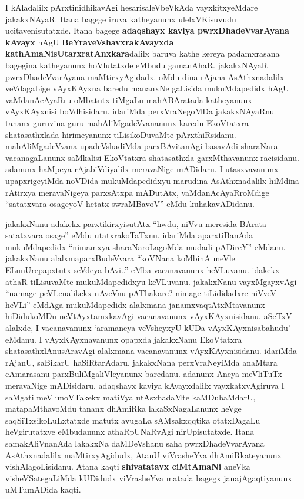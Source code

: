 I kAladalilx pArxtinidhikavAgi hesarisaleVbeVkAda vayxkitxyeMdare jakakxNAyaR. Itana bagege iruva katheyanunx ulelxVKisuvudu ucitavenisutatxde. Itana bagege \textbf{adaqshayx kaviya pwrxDhadeVvarAyana kAvayx} hAgU \textbf{BeYraveVshavxrakAvayxda kathAmaNisUtarxratAnxkara}dalilx baruva kathe kereya padamxrasana bagegina katheyanunx hoVlutatxde eMbudu gamanAhaR. jakakxNAyaR pwrxDhadeVvarAyana maMtirxyAgidadx. oMdu dina rAjana AsAthxnadalilx veVdagaLige vAyxKAyxna baredu mananxNe gaLisida mukuMdapedidx hAgU vaMdanAcAyaRru oMbatutx tiMgaLu mahABAratada katheyanunx vAyxKAyxnisi boVdhisidaru. idariMda perxVraNegoMDa jakakxNAyaRnu tananx guruvina guru mahA\-liMgadeVvananunx karedu EkoVtatxra shatasathxlada hirimeyanunx tiLisikoDuvaMte pArxthiRsidanu. mahAliMgadeVvana upadeVshadiMda parxBAvitanAgi basavAdi sharaNara vacanagaLanunx saMkalisi EkoVtatxra shatasathxla garxMthavanunx racisidanu. adanunx haMpeya rAjabiVdiyalilx meravaNige mADidaru. I utasxvavanunx upapxrigeyiMda noVDida mukuMdapedidxyu marudina AsAthxnadalilx hiMdina rAtirxya meravaNigeya parxsAtxpa mADutAtx, vaMdanAcAyaRroMdige ``satatxvara osageyoV hetatx swraMBavoV'' eMdu kuhakavADidanu.

\vskip 2pt

jakakxNanu adakekx parxtikirxyisutAtx ``hwdu, niVvu meresida BArata satatxvara osage'' eMdu utatxrakoTaTxnu. idariMda aparxtiBanAda mukuMdapedidx ``nimamxya sharaNaroLagoMda mudadi pADireY'' eMdanu. jakakxNanu alalxmaparxBudeVvara ``koVNana koMbinA meVle ELunUrepapxtutx seVdeya bAvi..'' eMba vacanavanunx heVLuvanu. idakekx athaR tiLisuvaMte mukuMdapedidxyu keVLuvanu. jakakxNanu vayxMgayxvAgi ``namage peVLenalikekx nAveVnu pAThakare? nimage tiLididadxre niVveV heVLi'' eMdAga mukuMdapedidx alalxmana janamxvaqtAtxMtavanunx hiDidukoMDu neVtAyxtamxkavAgi vacanavanunx vAyxKAyxnisidanu. aSeTxV alalxde, I vacanavanunx `aramaneya veVsheyxyU kUDa vAyxKAyxnisabahudu' eMdanu. I vAyxKAyxnavanunx opapxda jakakxNanu EkoVtatxra shatasathxlAnusAravAgi alalxmana vacanavanunx vAyxKAyxnisidanu. idariMda rAjanU, saBikarU haSiRtarAdaru. jakakxNana perxVraNeyiMda anaMtara cAmarasanu parxBuliMgaliVleyanunx baredanu. adanunx Aneya meVliTuTx meravaNige mADisidaru. adaqshayx kaviya kAvayxdalilx vayxkatxvAgiruva I saMgati meVlunoVTakekx matiVya utAsxhadaMte kaMDubaMdarU, matapaMthavoMdu tananx dhAmiRka lakaSxNagaLanunx heVge saqSiTxsikoLuLxtatxde matutx avugaLa sAMsakxqqtika otatxDagaLu heVgirutatxve eMbudanunx athaRpUNaRvAgi nirUpisutatxde. Itana samakAliVnanAda lakakxNa daMDeVshanu saha pwrxDhadeVvarAyana AsAthxnadalilx maMtirxyAgidudx, AtanU viVrasheYva dhAmiRkateyanunx vishAlagoLisidanu. Atana kaqti \textbf{shivatatavx ciMtAmaNi} aneVka visheVSategaLiMda kUDidudx viVrasheYva matada bagegx janajAgaqtiyanunx uMTumADida kaqti.


